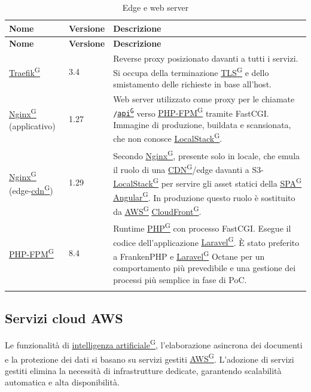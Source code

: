 \documentclass[a4paper,12pt]{article}
\providecommand{\glslink}[2]{\href{https://alittlebyte-19.github.io/Documentazione/glossario.html\#gls-#1}{\underline{#2}\textsuperscript{\scriptsize G}}}
\begin{document}
\renewcommand{\arraystretch}{1.3}
{\small
\setlength{\LTleft}{0pt}
\setlength{\LTright}{0pt}
\begin{longtable}{|p{3cm}|p{1.8cm}|p{9.7cm}|}
    \hline
    \rowcolor{gray!20}
    \textbf{Nome} & \textbf{Versione} & \textbf{Descrizione} \\
    \hline
    \endfirsthead
    \hline
    \rowcolor{gray!20}
    \textbf{Nome} & \textbf{Versione} & \textbf{Descrizione} \\
    \hline
    \endhead
    \glslink{traefik}{Traefik} & 3.4 & Reverse proxy posizionato davanti a tutti i servizi. Si occupa della terminazione \glslink{tls-transport-layer-security}{TLS} e dello smistamento delle richieste in base all'host. \\
    \hline
    \glslink{nginx}{Nginx} (applicativo) & 1.27 & Web server utilizzato come proxy per le chiamate \texttt{/\glslink{api-application-programming-interface}{api}} verso \glslink{php-fpm}{PHP-FPM} tramite FastCGI. Immagine di produzione, buildata e scansionata, che non conosce \glslink{localstack}{LocalStack}. \\
    \hline
    \glslink{nginx}{Nginx} (edge-\glslink{cdn-content-delivery-network}{cdn}) & 1.29 & Secondo \glslink{nginx}{Nginx}, presente solo in locale, che emula il ruolo di una \glslink{cdn-content-delivery-network}{CDN}/edge davanti a S3-\glslink{localstack}{LocalStack} per servire gli asset statici della \glslink{spa-single-page-application}{SPA} \glslink{angular}{Angular}. In produzione questo ruolo è sostituito da \glslink{aws}{AWS} \glslink{cloudfront}{CloudFront}. \\
    \hline
    \glslink{php-fpm}{PHP-FPM} & 8.4 & Runtime \glslink{php}{PHP} con processo FastCGI. Esegue il codice dell'applicazione \glslink{laravel}{Laravel}. È stato preferito a FrankenPHP e \glslink{laravel}{Laravel} Octane per un comportamento più prevedibile e una gestione dei processi più semplice in fase di PoC. \\
    \hline
    \caption{Edge e web server}
\end{longtable}
}

\subsection{Servizi cloud AWS}

Le funzionalità di \glslink{intelligenza-artificiale-ai}{intelligenza artificiale}, l'elaborazione asincrona dei documenti e la protezione dei dati si basano su servizi gestiti \glslink{aws}{AWS}. L'adozione di servizi gestiti elimina la necessità di infrastrutture dedicate, garantendo scalabilità automatica e alta disponibilità.
\end{document}
